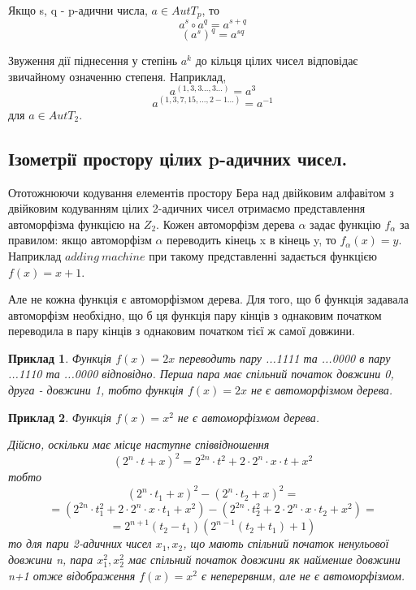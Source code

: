 \documentclass[a4paper,12pt]{article} \usepackage{a4wide}
\numberwithin{equation}{subsection}
\newtheorem{example}{Приклад}[subsection]
\begin{document}
 Якщо s, q -  p-адични числа,   $a \in AutT_p$, то $$a^s \circ  a^q = a^{s+q}$$ $$ (a^s)^q=a^{sq}$$

 Звуження дії піднесення у степінь $a^k$ до кільця цілих чисел відповідає звичайному означенню степеня. Наприклад, $$a^{(1,3,3...,3...)}=a^3$$
$$ a^{(1,3,7,15,...,2 - 1...)}=a^{-1}$$ для  $a\in AutT_2$.
\subsection{Ізометрії простору цілих p-адичних чисел.}


 Ототожнюючи кодування елементів простору Бера над двійковим алфавітом з двійковим кодуванням цілих
2-адичних чисел отримаємо представлення автоморфізма функцією на
$Z_2$. Кожен автоморфізм дерева $\alpha$ задає
функцію $f_\alpha$ за правилом: якщо автоморфізм $\alpha$ переводить кінець x в кінець
y, то $f_\alpha(x)=y$. Наприклад $adding \  machine$ при такому представленні
задається функцією $f(x)=x+1$.


Але не кожна функція є автоморфізмом дерева. Для
того, що б функція задавала автоморфізм необхідно, що б ця функція
пару кінців з однаковим початком переводила в пару кінців з
однаковим початком тієї ж самої довжини.
\begin{example}
Функція $f(x)=2x$
переводить пару ...1111 та ...0000 в пару ...1110 та ...0000
відповідно. Перша пара має спільний початок довжини 0, друга  -
довжини 1, тобто функція  $f(x)=2x$ не є автоморфізмом дерева.
\end{example}
\begin{example}
Функція $f(x)=x^2$ не є автоморфізмом дерева.

Дійсно, оскільки має місце наступне співвідношення $$(2^n\cdot t+x)^2=2^{2n}\cdot t^2+2\cdot 2^n\cdot x\cdot
t+x^2$$ тобто $$(2^n\cdot t_1+x)^2-(2^n\cdot t_2+x)^2=$$ $$=(2^{2n}\cdot t_1^2+2\cdot 2^n\cdot x\cdot
t_1+x^2)-(2^{2n}\cdot t_2^2+2\cdot 2^n\cdot x\cdot t_2+x^2)=$$$$= 2^{n+1}(t_2-t_1)(2^{n-1}(t_2+t_1)+1)$$ то для
пари 2-адичних чисел $x_1,x_2$, що мають спільний початок ненульової довжини n, пара $x_1^2,x_2^2$ має спільний
початок довжини як найменше довжини n+1
 отже
відображення $f(x)=x^2$ є неперервним, але не є автоморфізмом.
\end{example}
\end{document}

